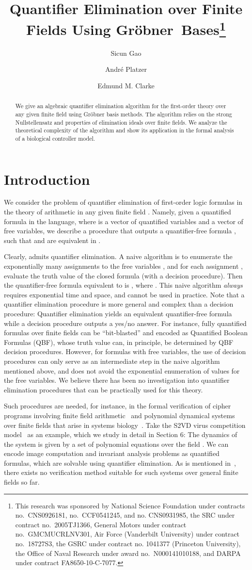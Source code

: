 \documentclass[envcountsect]{llncs}
\title{Quantifier Elimination over Finite Fields Using Gr\"obner~Bases\thanks{This research was sponsored by National Science
   Foundation under contracts no.~CNS0926181,
   no.~CCF0541245, and no. CNS0931985,
   the SRC under contract
   no.~2005TJ1366, General Motors under contract no.~GMCMUCRLNV301, Air 
Force
   (Vanderbilt University) under contract
   no.~18727S3, the GSRC under contract no. 1041377 
(Princeton University), the Office of Naval Research under award 
no.~N000141010188, and DARPA under contract FA8650-10-C-7077.
}}
\author{Sicun Gao\and Andr\'e Platzer \and Edmund M. Clarke }
\institute{Carnegie Mellon University, Pittsburgh, PA, USA}
\begin{document}
\maketitle
\begin{abstract} 
We give an algebraic quantifier elimination algorithm for the first-order theory over any given finite field using Gr\"obner basis methods. The algorithm relies on the strong Nullstellensatz and properties of elimination ideals over finite fields. We analyze the theoretical complexity of the algorithm and show its application in the formal analysis of a biological controller model.
\end{abstract}

\section{Introduction}

We consider the problem of quantifier elimination of first-order logic formulas in the theory  of arithmetic in any given finite field . Namely, given a quantified formula  in the language, where  is a vector of quantified variables and  a vector of free variables, we describe a procedure that outputs a quantifier-free formula , such that  and  are equivalent in . 

Clearly,  admits quantifier elimination. A naive algorithm is to enumerate the exponentially many assignments to the free variables , and for each assignment , evaluate the truth value of the closed formula  (with a decision procedure). Then the quantifier-free formula equivalent to  is , where . This naive algorithm {\em always} requires exponential time and space, and cannot be used in practice. Note that a quantifier elimination procedure is more general and complex than a decision procedure: Quantifier elimination yields an equivalent quantifier-free formula  while a decision procedure outputs a yes/no answer. For instance, fully quantified formulas over finite fields can be ``bit-blasted'' and encoded as Quantified Boolean Formulas (QBF), whose truth value can, in principle, be determined by QBF decision procedures. However, for formulas with free variables, the use of decision procedures can only serve as an intermediate step in the naive algorithm mentioned above, and does not avoid the exponential enumeration of values for the free variables. We believe there has been no investigation into quantifier elimination procedures that can be practically used for this theory. 

Such procedures are needed, for instance, in the formal verification of cipher programs involving finite field arithmetic~\cite{SmithD08,using} and polynomial dynamical systems over finite fields that arise in systems biology~\cite{virus,bio2,poly}. Take the S2VD virus competition model~\cite{virus} as an example, which we study in detail in Section 6: The dynamics of the system is given by a set of polynomial equations over the field . We can encode image computation and invariant analysis problems as quantified formulas, which are solvable using quantifier elimination. As is mentioned in~\cite{virus}, there exists no verification method suitable for such systems over general finite fields so far.
\end{document}
